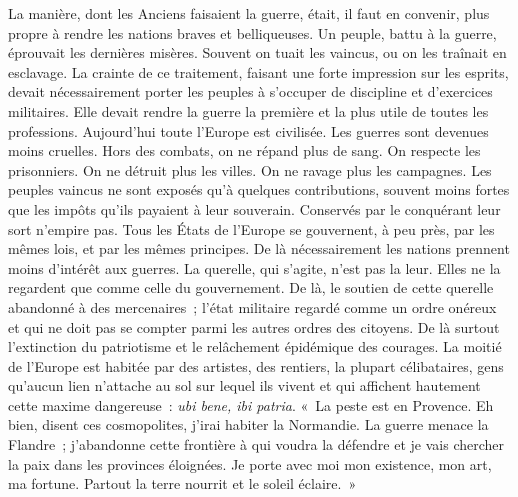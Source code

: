 \documentclass[french,twoside]{book} %
\begin{document}
La manière, dont les Anciens faisaient la guerre, était, il faut en convenir, plus propre à rendre les nations braves et belliqueuses. Un peuple, battu à la guerre, éprouvait les dernières misères. Souvent on tuait les vaincus, ou on les traînait en esclavage. La crainte de ce traitement, faisant une forte impression sur les esprits, devait nécessairement porter les peuples à s’occuper de discipline et d’exercices militaires. Elle devait rendre la guerre la première et la plus utile de toutes les professions. Aujourd’hui toute l’Europe est civilisée. Les guerres sont devenues moins cruelles. Hors des combats, on ne répand plus de sang. On respecte les prisonniers. On ne détruit plus les villes. On ne ravage plus les campagnes. Les peuples vaincus ne sont exposés qu’à quelques contributions, souvent moins fortes que les impôts qu’ils payaient à leur souverain. Conservés par le conquérant leur sort n’empire pas. Tous les États de l’Europe se gouvernent, à peu près, par les mêmes lois, et par les mêmes principes. De là nécessairement les nations prennent moins d’intérêt aux guerres. La querelle, qui s’agite, n’est pas la leur. Elles ne la regardent que comme celle du gouvernement. De là, le soutien de cette querelle abandonné à des mercenaires ; l’état militaire regardé comme un ordre onéreux et qui ne doit pas se compter parmi les autres ordres des citoyens. De là surtout l’extinction du patriotisme et le relâchement épidémique des courages. La moitié de l’Europe est habitée par des artistes, des rentiers, la plupart célibataires, gens qu’aucun lien n’attache au sol sur lequel ils vivent et qui affichent hautement cette maxime dangereuse : {\itshape ubi bene, ibi patria}. « La peste est en Provence. Eh bien, disent ces cosmopolites, j’irai habiter la Normandie. La guerre menace la Flandre ; j’abandonne cette frontière à qui voudra la défendre et je vais chercher la paix dans les provinces éloignées. Je porte avec moi mon existence, mon art, ma fortune. Partout la terre nourrit et le soleil éclaire. »\par
\end{document}
